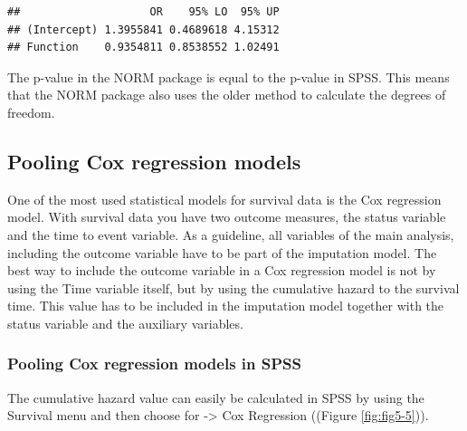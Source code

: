 \documentclass[]{book}
\newenvironment{Shaded}{\begin{snugshade}}{\end{snugshade}}
\newcommand{\KeywordTok}[1]{\textcolor[rgb]{0.13,0.29,0.53}{\textbf{#1}}}
\newcommand{\DecValTok}[1]{\textcolor[rgb]{0.00,0.00,0.81}{#1}}
\newcommand{\StringTok}[1]{\textcolor[rgb]{0.31,0.60,0.02}{#1}}
\newcommand{\OperatorTok}[1]{\textcolor[rgb]{0.81,0.36,0.00}{\textbf{#1}}}
\newcommand{\NormalTok}[1]{#1}
\theoremstyle{definition}
\theoremstyle{definition}
\theoremstyle{definition}
\theoremstyle{remark}
\begin{document}
\begin{Shaded}
\end{Shaded}

\begin{verbatim}
##                    OR    95% LO  95% UP
## (Intercept) 1.3955841 0.4689618 4.15312
## Function    0.9354811 0.8538552 1.02491
\end{verbatim}

The p-value in the NORM package is equal to the p-value in SPSS. This
means that the NORM package also uses the older method to calculate the
degrees of freedom.

\subsection{Pooling Cox regression
models}\label{pooling-cox-regression-models}

One of the most used statistical models for survival data is the Cox
regression model. With survival data you have two outcome measures, the
status variable and the time to event variable. As a guideline, all
variables of the main analysis, including the outcome variable have to
be part of the imputation model. The best way to include the outcome
variable in a Cox regression model is not by using the Time variable
itself, but by using the cumulative hazard to the survival time. This
value has to be included in the imputation model together with the
status variable and the auxiliary variables.

\subsubsection{Pooling Cox regression models in
SPSS}\label{pooling-cox-regression-models-in-spss}

The cumulative hazard value can easily be calculated in SPSS by using
the Survival menu and then choose for -\textgreater{} Cox Regression
((Figure \ref{fig:fig5-5})).
\end{document}

